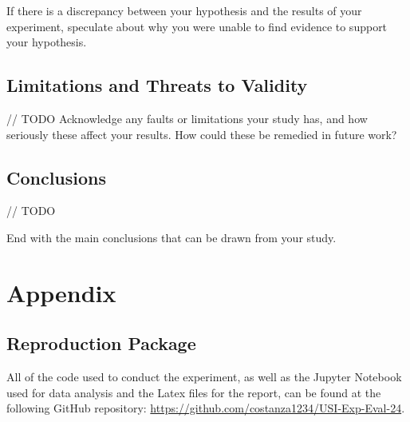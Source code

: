 \documentclass[unicode,11pt,a4paper,oneside,numbers=endperiod,openany]{scrartcl}
\begin{document}
    If there is a discrepancy between your hypothesis and the results of your experiment, speculate about why you were unable to find evidence to support your hypothesis. 


    \subsection{Limitations and Threats to Validity}

    // TODO
    Acknowledge any faults or limitations your study has, and how seriously these affect your results. How could these be remedied in future work?


    \subsection{Conclusions}

    // TODO
    
    End with the main conclusions that can be drawn from your study.

\section{Appendix}

    \subsection{Reproduction Package}
    All of the code used to conduct the experiment, as well as the Jupyter Notebook used for data analysis and the Latex files for the report, can be found at the following GitHub repository: \url{https://github.com/costanza1234/USI-Exp-Eval-24}.
\end{document}
